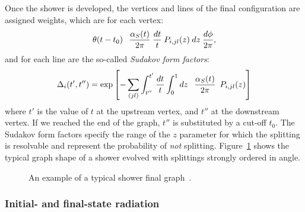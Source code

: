 Once the shower is developed, the vertices and lines of the final configuration are
assigned weights, which are for each vertex:
  \begin{equation}
    \label{eq:splitvert} \theta (t - t_0) \hspace{0.75em} \frac{\alpha_S
    (t)}{2 \pi} \hspace{0.25em} \frac{dt}{t} \hspace{0.25em} P_{i, j l} (z)
    \hspace{0.25em} dz \hspace{0.25em} \frac{d \phi}{2 \pi},
  \end{equation}
and for each line are the so-called {\it Sudakov form factors}:
  \begin{equation}
    \label{eq:sudadef} \Delta_i (t', t'') = \exp \left[ - \sum_{(j l)}
    \int_{t''}^{t'} \frac{dt}{t} \int_0^1 d z \hspace{0.75em} \frac{\alpha_S
    (t)}{2 \pi} \hspace{0.25em} \hspace{0.25em} P_{i, j l} (z) \right]
  \end{equation}
where $t'$ is the value of $t$ at the upstream vertex, and $t''$ 
at the downstream vertex. If we reached the end of the graph,
$t''$ is substituted by a cut-off $t_0$.
The Sudakov form factors specify the range of the $z$ parameter for 
which the splitting is resolvable and represent the probability
of {\it not} splitting. Figure~\ref{fig:showergraph} shows
the typical graph shape of a shower evolved with splittings
strongly ordered in angle.

\begin{figure}[hbt]\begin{center}
	\caption{An example of a typical shower final graph~\cite{Ambroglini:2009nz}.\label{fig:showergraph}}
\end{center}\end{figure}

\subsubsection{Initial- and final-state radiation}\label{sec:isrfsr}

